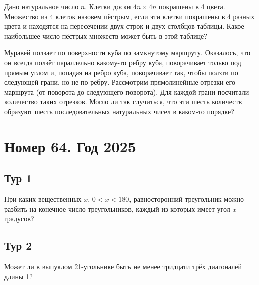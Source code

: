 \documentclass[11pt, a4paper]{common/document_template}
\begin{document}
\begin{exercise}
Дано натуральное число $n$. Клетки доски $4n \times 4n$ покрашены в 4 цвета. Множество из 4 клеток назовем пёстрым, если эти клетки покрашены в 4 разных цвета и находятся на пересечении двух строк и двух столбцов таблицы. Какое наибольшее число пёстрых множеств может быть в этой таблице?
\end{exercise}

\begin{exercise}
Муравей ползает по поверхности куба по замкнутому маршруту. Оказалось,
что он всегда ползёт параллельно какому-то ребру куба, поворачивает только под прямым углом и, попадая на ребро куба, поворачивает так, чтобы ползти по следующей грани, но не по ребру. Рассмотрим прямолинейные отрезки его маршрута (от поворота до следующего поворота). Для каждой грани посчитали количество таких отрезков. Могло ли так случиться, что эти шесть количеств образуют шесть последовательных натуральных чисел в каком-то порядке?
\end{exercise}

\chapter{Номер 64. Год 2025}

\section{Тур 1}

\begin{exercise}
При каких вещественных $x$, $0 < x < 180$, равносторонний треугольник можно разбить на конечное число треугольников, каждый из которых имеет угол $x$ градусов?
\end{exercise}

\section{Тур 2}

\begin{exercise}
Может ли в выпуклом 21-угольнике быть не менее тридцати трёх диагоналей длины 1?
\end{exercise}
\end{document}
